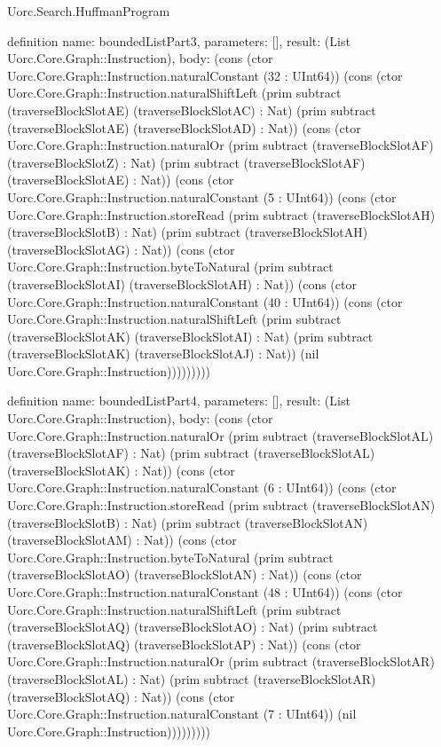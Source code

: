 \begin{lexlean}{Uorc.Search.HuffmanProgram}
\begin{semanticmodule}
definition{
  name: boundedListPart3,
  parameters: [],
  result: (List Uorc.Core.Graph::Instruction),
  body: (cons (ctor Uorc.Core.Graph::Instruction.naturalConstant (32 : UInt64)) (cons (ctor Uorc.Core.Graph::Instruction.naturalShiftLeft (prim subtract (traverseBlockSlotAE) (traverseBlockSlotAC) : Nat) (prim subtract (traverseBlockSlotAE) (traverseBlockSlotAD) : Nat)) (cons (ctor Uorc.Core.Graph::Instruction.naturalOr (prim subtract (traverseBlockSlotAF) (traverseBlockSlotZ) : Nat) (prim subtract (traverseBlockSlotAF) (traverseBlockSlotAE) : Nat)) (cons (ctor Uorc.Core.Graph::Instruction.naturalConstant (5 : UInt64)) (cons (ctor Uorc.Core.Graph::Instruction.storeRead (prim subtract (traverseBlockSlotAH) (traverseBlockSlotB) : Nat) (prim subtract (traverseBlockSlotAH) (traverseBlockSlotAG) : Nat)) (cons (ctor Uorc.Core.Graph::Instruction.byteToNatural (prim subtract (traverseBlockSlotAI) (traverseBlockSlotAH) : Nat)) (cons (ctor Uorc.Core.Graph::Instruction.naturalConstant (40 : UInt64)) (cons (ctor Uorc.Core.Graph::Instruction.naturalShiftLeft (prim subtract (traverseBlockSlotAK) (traverseBlockSlotAI) : Nat) (prim subtract (traverseBlockSlotAK) (traverseBlockSlotAJ) : Nat)) (nil Uorc.Core.Graph::Instruction)))))))))
}

definition{
  name: boundedListPart4,
  parameters: [],
  result: (List Uorc.Core.Graph::Instruction),
  body: (cons (ctor Uorc.Core.Graph::Instruction.naturalOr (prim subtract (traverseBlockSlotAL) (traverseBlockSlotAF) : Nat) (prim subtract (traverseBlockSlotAL) (traverseBlockSlotAK) : Nat)) (cons (ctor Uorc.Core.Graph::Instruction.naturalConstant (6 : UInt64)) (cons (ctor Uorc.Core.Graph::Instruction.storeRead (prim subtract (traverseBlockSlotAN) (traverseBlockSlotB) : Nat) (prim subtract (traverseBlockSlotAN) (traverseBlockSlotAM) : Nat)) (cons (ctor Uorc.Core.Graph::Instruction.byteToNatural (prim subtract (traverseBlockSlotAO) (traverseBlockSlotAN) : Nat)) (cons (ctor Uorc.Core.Graph::Instruction.naturalConstant (48 : UInt64)) (cons (ctor Uorc.Core.Graph::Instruction.naturalShiftLeft (prim subtract (traverseBlockSlotAQ) (traverseBlockSlotAO) : Nat) (prim subtract (traverseBlockSlotAQ) (traverseBlockSlotAP) : Nat)) (cons (ctor Uorc.Core.Graph::Instruction.naturalOr (prim subtract (traverseBlockSlotAR) (traverseBlockSlotAL) : Nat) (prim subtract (traverseBlockSlotAR) (traverseBlockSlotAQ) : Nat)) (cons (ctor Uorc.Core.Graph::Instruction.naturalConstant (7 : UInt64)) (nil Uorc.Core.Graph::Instruction)))))))))
}


\end{semanticmodule}
\end{lexlean}
